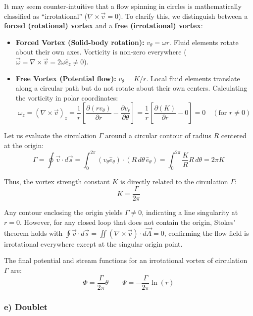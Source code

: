 \begin{expertbox}
It may seem counter-intuitive that a flow spinning in circles is mathematically classified as ``irrotational'' ($\nabla \times \vec{v} = 0$). To clarify this, we distinguish between a \textbf{forced (rotational) vortex} and a \textbf{free (irrotational) vortex}:
\begin{itemize}
    \item \textbf{Forced Vortex (Solid-body rotation):} $v_\theta = \omega r$. Fluid elements rotate about their own axes. Vorticity is non-zero everywhere ($\vec{\omega} = \nabla \times \vec{v} = 2\omega \hat{e}_z \neq 0$).
    \item \textbf{Free Vortex (Potential flow):} $v_\theta = K/r$. Local fluid elements translate along a circular path but do not rotate about their own centers. Calculating the vorticity in polar coordinates:
    $$\omega_z = (\nabla \times \vec{v})_z = \frac{1}{r} \left[ \frac{\partial (r v_\theta)}{\partial r} - \frac{\partial v_r}{\partial \theta} \right] = \frac{1}{r} \left[ \frac{\partial (K)}{\partial r} - 0 \right] = 0 \quad (\text{for } r \neq 0)$$
\end{itemize}

Let us evaluate the circulation $\Gamma$ around a circular contour of radius $R$ centered at the origin:
$$\Gamma = \oint \vec{v} \cdot d\vec{s} = \int_{0}^{2\pi} \left( v_\theta \hat{e}_\theta \right) \cdot \left( R \, d\theta \, \hat{e}_\theta \right) = \int_{0}^{2\pi} \frac{K}{R} R \, d\theta = 2\pi K$$

Thus, the vortex strength constant $K$ is directly related to the circulation $\Gamma$:
$$K = \frac{\Gamma}{2\pi}$$

Any contour enclosing the origin yields $\Gamma \neq 0$, indicating a line singularity at $r = 0$. However, for any closed loop that does not contain the origin, Stokes' theorem holds with $\oint \vec{v} \cdot d\vec{s} = \iint (\nabla \times \vec{v}) \cdot d\vec{A} = 0$, confirming the flow field is irrotational everywhere except at the singular origin point.
\end{expertbox}

The final potential and stream functions for an irrotational vortex of circulation $\Gamma$ are:
$$\Phi = \frac{\Gamma}{2\pi}\theta \qquad \Psi = -\frac{\Gamma}{2\pi}\ln(r)$$

\subsubsection{e) Doublet}

